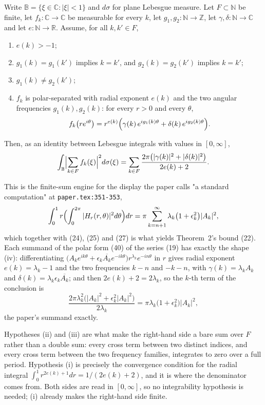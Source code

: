 \begin{helper}
Write $\mathbb{B}=\{\xi\in\mathbb{C}:|\xi|<1\}$ and $d\sigma$ for plane
Lebesgue measure.  Let $F\subset\mathbb{N}$ be finite, let
$f_k\colon\mathbb{C}\to\mathbb{C}$ be measurable for every $k$, let
$g_1,g_2\colon\mathbb{N}\to\mathbb{Z}$, let
$\gamma,\delta\colon\mathbb{N}\to\mathbb{C}$ and let
$e\colon\mathbb{N}\to\mathbb{R}$.  Assume, for all $k,k'\in F$,
\begin{enumerate}
\item[(i)] $e(k)>-1$;
\item[(ii)] $g_1(k)=g_1(k')$ implies $k=k'$, and $g_2(k)=g_2(k')$ implies
  $k=k'$;
\item[(iii)] $g_1(k)\neq g_2(k')$;
\item[(iv)] $f_k$ is polar-separated with radial exponent $e(k)$ and the two
  angular frequencies $g_1(k),g_2(k)$: for every $r>0$ and every $\theta$,
  \[
    f_k\bigl(re^{i\theta}\bigr)
    =r^{e(k)}\Bigl(\gamma(k)\,e^{ig_1(k)\theta}
      +\delta(k)\,e^{ig_2(k)\theta}\Bigr).
  \]
\end{enumerate}
Then, as an identity between Lebesgue integrals with values in $[0,\infty]$,
\[
  \int_{\mathbb{B}}\Bigl|\sum_{k\in F}f_k(\xi)\Bigr|^{2}d\sigma(\xi)
  =\sum_{k\in F}\frac{2\pi\bigl(|\gamma(k)|^{2}+|\delta(k)|^{2}\bigr)}
      {2e(k)+2}.
\]

This is the finite-sum engine for the display the paper calls "a standard
computation" at \texttt{paper.tex:351-353},
\[
  \int_0^1r\Bigl(\int_0^{2\pi}|H_r(r,\theta)|^{2}d\theta\Bigr)dr
  =\pi\sum_{k=n+1}^{\infty}\lambda_k\bigl(1+\epsilon_k^{2}\bigr)|A_k|^{2},
\]
which together with (24), (25) and (27) is what yields Theorem~2's bound (22).
Each summand of the polar form (40) of the series (19) has exactly the shape
(iv): differentiating $\bigl(A_ke^{ik\theta}+\epsilon_k\overline{A_k}
e^{-ik\theta}\bigr)r^{\lambda_k}e^{-in\theta}$ in $r$ gives radial exponent
$e(k)=\lambda_k-1$ and the two frequencies $k-n$ and $-k-n$, with
$\gamma(k)=\lambda_kA_k$ and $\delta(k)=\lambda_k\epsilon_k\overline{A_k}$; and
then $2e(k)+2=2\lambda_k$, so the $k$-th term of the conclusion is
\[
  \frac{2\pi\lambda_k^{2}\bigl(|A_k|^{2}+\epsilon_k^{2}|A_k|^{2}\bigr)}
    {2\lambda_k}
  =\pi\lambda_k\bigl(1+\epsilon_k^{2}\bigr)|A_k|^{2},
\]
the paper's summand exactly.

Hypotheses (ii) and (iii) are what make the right-hand side a bare sum over
$F$ rather than a double sum: every cross term between two distinct indices,
and every cross term between the two frequency families, integrates to zero
over a full period.  Hypothesis (i) is precisely the convergence condition for
the radial integral $\int_0^1r^{2e(k)+1}dr=1/(2e(k)+2)$, and it is where the
denominator comes from.  Both sides are read in $[0,\infty]$, so no
integrability hypothesis is needed; (i) already makes the right-hand side
finite.
\end{helper}
